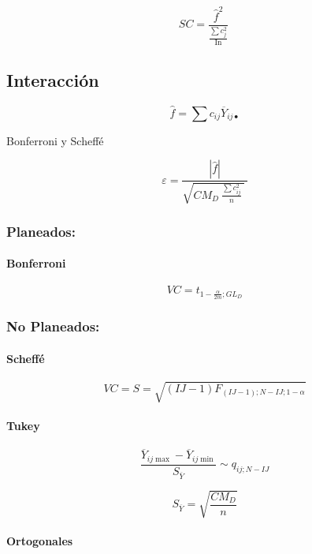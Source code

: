 \documentclass[]{book}
\let\oldparagraph\paragraph
\renewcommand{\paragraph}[1]{\oldparagraph{#1}\mbox{}}
\theoremstyle{definition}
\theoremstyle{definition}
\theoremstyle{definition}
\theoremstyle{remark}
\begin{document}
\[
SC = \frac{{\hat{f}}^{2}}{\frac{\sum c_{j}^{2}}{\text{In}}}\ 
\]

\hypertarget{interaccion-1}{%
\subsection{Interacción}\label{interaccion-1}}

\[
\hat{f} = \sum c_{ij}{\overline{Y}_{ij \bullet}}
\]

Bonferroni y Scheffé

\[
\varepsilon = \frac{\left| \hat{f} \right|}{\sqrt{CM_{D}\left. \ \frac{\sum c_{ij}^{2}}{n} \right.\ }\ }
\]

\hypertarget{planeados-3}{%
\subsubsection{Planeados:}\label{planeados-3}}

\hypertarget{bonferroni-2}{%
\paragraph{Bonferroni}\label{bonferroni-2}}

\[
VC = t_{1 - \frac{\alpha}{2m};GL_{D}}
\]

\hypertarget{no-planeados-3}{%
\subsubsection{No Planeados:}\label{no-planeados-3}}

\hypertarget{scheffe-2}{%
\paragraph{Scheffé}\label{scheffe-2}}

\[
VC = S = \sqrt{\left( IJ - 1 \right)F_{\left( IJ - 1 \right);N - IJ;1 - \alpha}}
\]

\hypertarget{tukey-2}{%
\paragraph{Tukey}\label{tukey-2}}

\[
\frac{\overline{Y}_{ij \max} - \overline{Y}_{ij\min}}{S_{\overline{Y}}}
\sim q_{ij;N - IJ}
\]

\[
S_{\overline{Y}} = \sqrt{\frac{CM_{D}}{n}}
\]

\hypertarget{ortogonales-2}{%
\paragraph{Ortogonales}\label{ortogonales-2}}
\end{document}
